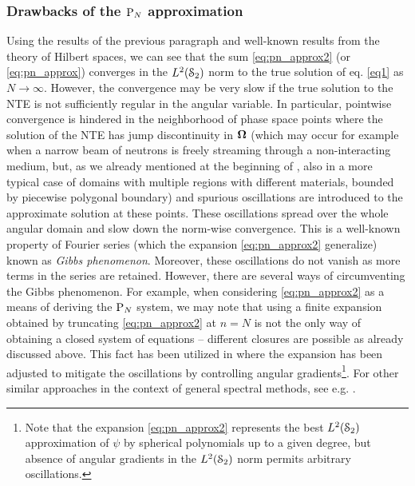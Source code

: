 \subsubsection{Drawbacks of the $\PN$ approximation}
Using the results of the previous paragraph and well-known results from the theory of Hilbert spaces, we can see that
the sum \eqref{eq:pn_approx2} (or \eqref{eq:pn_approx}) converges in the $\Lp[2](\Sphere)$ norm to the true solution of
eq. \eqref{eq1} as $N\to\infty$. However, the convergence may be very slow if the true solution to the NTE is not
sufficiently regular in the angular variable. In particular, pointwise convergence is hindered in the neighborhood of
phase space points where the solution of the NTE has jump discontinuity in $\bomega$ (which may occur for example when a
narrow beam of neutrons is freely streaming through a non-interacting medium, but, as we already mentioned at the
beginning of , also in a more typical case of domains with multiple regions with different materials,
bounded by piecewise polygonal boundary) and spurious oscillations are introduced to the approximate solution at these points.
These oscillations spread over the whole angular domain and slow down the norm-wise convergence. This is a well-known
property of Fourier series (which the expansion \eqref{eq:pn_approx2} generalize) known as \textit{Gibbs phenomenon}.
Moreover, these oscillations do not vanish as more terms in the series are retained. However, there are several ways of
circumventing the Gibbs phenomenon. For example, when considering \eqref{eq:pn_approx2} as a means of deriving the $\PN$
system, we may note that using a finite expansion obtained by truncating \eqref{eq:pn_approx2} at $n=N$ is not the only
way of obtaining a closed system of equations -- different closures are possible as already discussed above. This fact
has been utilized in \cite{McClarren3} where the expansion has been adjusted to mitigate the oscillations by controlling
angular gradients\footnote{Note that the expansion \eqref{eq:pn_approx2} represents the best $\Lp[2](\Sphere)$
approximation of $\psi$ by spherical polynomials up to a given degree, but absence of angular gradients in the
$\Lp[2](\Sphere)$ norm permits arbitrary oscillations.}. For other similar approaches in the context of general spectral
methods, see e.g. \cite{Tanner}.

